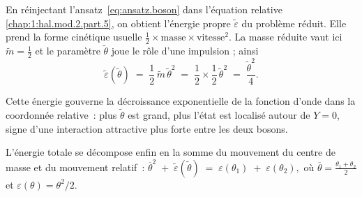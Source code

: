 En réinjectant l’ansatz~\eqref{eq:ansatz.boson} dans l’équation relative
\eqref{chap:1:hal.mod.2.part.5}, on obtient l’énergie propre
\(\tilde{\varepsilon}\) du problème réduit.  
Elle prend la forme cinétique usuelle
\(\tfrac{1}{2}\times\text{masse}\times\text{vitesse}^{2}\).  
La masse réduite vaut ici \(\tilde{m}= \frac{1}{2}\) et le paramètre
\(\tilde{\theta}\) joue le rôle d’une impulsion ; ainsi
\begin{equation}
   \tilde{\varepsilon}(\tilde{\theta})
   \;=\;
   \frac{1}{2}\,\tilde{m}\,\tilde{\theta}^{2}
   \;=\;
   \frac{1}{2}\times\frac{1}{2}\,\tilde{\theta}^{2}
   \;=\;
   \frac{\tilde{\theta}^{2}}{4}.
   \label{eq:energie_relative}
\end{equation}

Cette énergie gouverne la décroissance exponentielle de la fonction
d’onde dans la coordonnée relative : plus \(\tilde{\theta}\) est grand,
plus l’état est localisé autour de \(Y=0\), signe d’une interaction
attractive plus forte entre les deux bosons.

L’énergie totale se décompose enfin en la somme du mouvement du centre
de masse et du mouvement relatif :
\(
   \overline{\theta}^{2}
   \;+\;
   \tilde{\varepsilon}(\tilde{\theta})
   \;=\;
   \varepsilon(\theta_{1})
   \;+\;
   \varepsilon(\theta_{2}),
\)
où \(\overline{\theta}= \tfrac{\theta_{1}+\theta_{2}}{2}\) et
\(\varepsilon(\theta)=\theta^{2}/2\).






